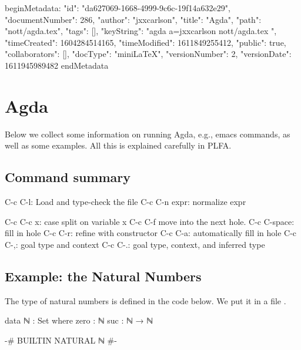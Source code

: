 beginMetadata:
{
    "id": "da627069-1668-4999-9c6c-19f14a632e29",
    "documentNumber": 286,
    "author": "jxxcarlson",
    "title": "Agda",
    "path": "nott/agda.tex",
    "tags": [],
    "keyString": "agda a=jxxcarlson nott/agda.tex ",
    "timeCreated": 1604284514165,
    "timeModified": 1611849255412,
    "public": true,
    "collaborators": [],
    "docType": "miniLaTeX",
    "versionNumber": 2,
    "versionDate": 1611945989482
}
endMetadata



\setcounter{section}{3}

\section{Agda}

\innertableofcontents



Below we collect some information on running Agda, e.g., emacs commands, as well as some examples.  All this is explained carefully in PLFA.

\subsection{Command summary}

\begin{colored}[bash]
C-c C-l: Load and type-check the file
C-c C-n expr: normalize expr

C-c C-c x: case split on variable x
C-c C-f move into the next hole.
C-c C-space: fill in hole
C-c C-r: refine with constructor
C-c C-a: automatically fill in hole
C-c C-,: goal type and context
C-c C-.: goal type, context, and inferred type
\end{colored}


\subsection{Example: the Natural Numbers}

The type of natural numbers is defined in the code below.  We put it in a file .

\begin{colored}[elm]
data ℕ : Set where
    zero : ℕ
    suc  : ℕ → ℕ
  
{-# BUILTIN NATURAL ℕ #-}
\end{colored}

